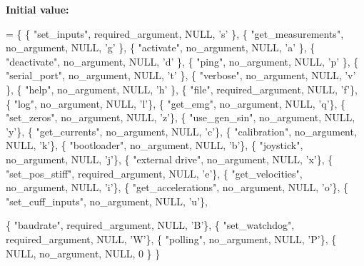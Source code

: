 {\bfseries Initial value\+:}
\begin{DoxyCode}
= \{
    \{ \textcolor{stringliteral}{"set\_inputs"}, required\_argument, NULL, \textcolor{charliteral}{'s'} \},
    \{ \textcolor{stringliteral}{"get\_measurements"}, no\_argument, NULL, \textcolor{charliteral}{'g'} \},
    \{ \textcolor{stringliteral}{"activate"}, no\_argument, NULL, \textcolor{charliteral}{'a'} \},
    \{ \textcolor{stringliteral}{"deactivate"}, no\_argument, NULL, \textcolor{charliteral}{'d'} \},
    \{ \textcolor{stringliteral}{"ping"}, no\_argument, NULL, \textcolor{charliteral}{'p'} \},
    \{ \textcolor{stringliteral}{"serial\_port"}, no\_argument, NULL, \textcolor{charliteral}{'t'} \},
    \{ \textcolor{stringliteral}{"verbose"}, no\_argument, NULL, \textcolor{charliteral}{'v'} \},
    \{ \textcolor{stringliteral}{"help"}, no\_argument, NULL, \textcolor{charliteral}{'h'} \},
    \{ \textcolor{stringliteral}{"file"}, required\_argument, NULL, \textcolor{charliteral}{'f'}\},
    \{ \textcolor{stringliteral}{"log"}, no\_argument, NULL, \textcolor{charliteral}{'l'}\},
    \{ \textcolor{stringliteral}{"get\_emg"}, no\_argument, NULL, \textcolor{charliteral}{'q'}\},
    \{ \textcolor{stringliteral}{"set\_zeros"}, no\_argument, NULL, \textcolor{charliteral}{'z'}\},
    \{ \textcolor{stringliteral}{"use\_gen\_sin"}, no\_argument, NULL, \textcolor{charliteral}{'y'}\},
    \{ \textcolor{stringliteral}{"get\_currents"}, no\_argument, NULL, \textcolor{charliteral}{'c'}\},
    \{ \textcolor{stringliteral}{"calibration"}, no\_argument, NULL, \textcolor{charliteral}{'k'}\},
    \{ \textcolor{stringliteral}{"bootloader"}, no\_argument, NULL, \textcolor{charliteral}{'b'}\},
    \{ \textcolor{stringliteral}{"joystick"}, no\_argument, NULL, \textcolor{charliteral}{'j'}\},
    \{ \textcolor{stringliteral}{"external drive"}, no\_argument, NULL, \textcolor{charliteral}{'x'}\},
    \{ \textcolor{stringliteral}{"set\_pos\_stiff"}, required\_argument, NULL, \textcolor{charliteral}{'e'}\},
    \{ \textcolor{stringliteral}{"get\_velocities"}, no\_argument, NULL, \textcolor{charliteral}{'i'}\},
    \{ \textcolor{stringliteral}{"get\_accelerations"}, no\_argument, NULL, \textcolor{charliteral}{'o'}\},
    \{ \textcolor{stringliteral}{"set\_cuff\_inputs"}, no\_argument, NULL, \textcolor{charliteral}{'u'}\},
   
    \{ \textcolor{stringliteral}{"baudrate"}, required\_argument, NULL, \textcolor{charliteral}{'B'}\},
    \{ \textcolor{stringliteral}{"set\_watchdog"}, required\_argument, NULL, \textcolor{charliteral}{'W'}\},
    \{ \textcolor{stringliteral}{"polling"}, no\_argument, NULL, \textcolor{charliteral}{'P'}\},
    \{ NULL, no\_argument, NULL, 0 \}
\}
\end{DoxyCode}

